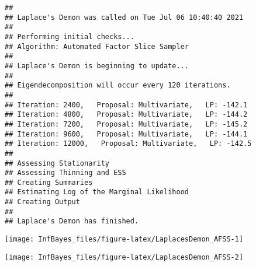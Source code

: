 \documentclass[
]{book}
\newenvironment{Shaded}{\begin{snugshade}}{\end{snugshade}}
\newcommand{\AttributeTok}[1]{\textcolor[rgb]{0.77,0.63,0.00}{#1}}
\newcommand{\ConstantTok}[1]{\textcolor[rgb]{0.00,0.00,0.00}{#1}}
\newcommand{\DecValTok}[1]{\textcolor[rgb]{0.00,0.00,0.81}{#1}}
\newcommand{\FunctionTok}[1]{\textcolor[rgb]{0.00,0.00,0.00}{#1}}
\newcommand{\NormalTok}[1]{#1}
\newcommand{\OtherTok}[1]{\textcolor[rgb]{0.56,0.35,0.01}{#1}}
\newcommand{\SpecialCharTok}[1]{\textcolor[rgb]{0.00,0.00,0.00}{#1}}
\newcommand{\StringTok}[1]{\textcolor[rgb]{0.31,0.60,0.02}{#1}}
\begin{document}
\begin{verbatim}
## 
## Laplace's Demon was called on Tue Jul 06 10:40:40 2021
## 
## Performing initial checks...
## Algorithm: Automated Factor Slice Sampler 
## 
## Laplace's Demon is beginning to update...
## 
## Eigendecomposition will occur every 120 iterations.
## 
## Iteration: 2400,   Proposal: Multivariate,   LP: -142.1
## Iteration: 4800,   Proposal: Multivariate,   LP: -144.2
## Iteration: 7200,   Proposal: Multivariate,   LP: -145.2
## Iteration: 9600,   Proposal: Multivariate,   LP: -144.1
## Iteration: 12000,   Proposal: Multivariate,   LP: -142.5
## 
## Assessing Stationarity
## Assessing Thinning and ESS
## Creating Summaries
## Estimating Log of the Marginal Likelihood
## Creating Output
## 
## Laplace's Demon has finished.
\end{verbatim}

\begin{Shaded}
\end{Shaded}

\begin{center}\texttt{[image: InfBayes\_files/figure-latex/LaplacesDemon\_AFSS-1]} \end{center}

\begin{center}\texttt{[image: InfBayes\_files/figure-latex/LaplacesDemon\_AFSS-2]} \end{center}
\end{document}
